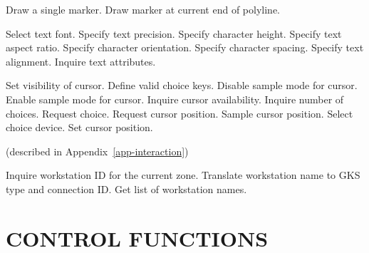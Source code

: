 \documentclass[11pt]{article}
\newcommand{\hyperref}[4]{#2\ref{#4}#3}
\begin{document}
\begin{routinelist}
   Draw a single marker.
   Draw marker at current end of polyline.
\end{routinelist}

\begin{routinelist}
   Select text font.
   Specify text precision.
   Specify character height.
   Specify text aspect ratio.
   Specify character orientation.
   Specify character spacing.
   Specify text alignment.
   Inquire text attributes.
\end{routinelist}

\begin{routinelist}
   Set visibility of cursor.
   Define valid choice keys.
   Disable sample mode for cursor.
   Enable sample mode for cursor.
   Inquire cursor availability.
   Inquire number of choices.
   Request choice.
   Request cursor position.
   Sample cursor position.
   Select choice device.
   Set cursor position.
\end{routinelist}

 (described in
\hyperref{this appendix}{Appendix~}{}{app-interaction})
\begin{routinelist}
   Inquire workstation ID for the current zone.
   Translate workstation name to GKS type and connection ID.
   Get list of workstation names.
\end{routinelist}
                                         
\section {CONTROL FUNCTIONS}\label{sec-control}
\end{document}
